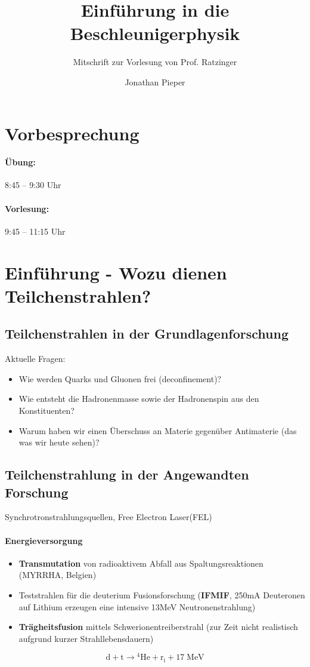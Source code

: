 \documentclass[12pt,DIV=15,a4paper,twoside,draft=false]{scrartcl}
\author{Jonathan Pieper}
\title{Einführung in die Beschleunigerphysik}
\subtitle{Mitschrift zur Vorlesung von Prof. Ratzinger}
\begin{document}
\begin{titlepage}
\maketitle
\tableofcontents
\end{titlepage}

\section{Vorbesprechung}
\paragraph{Übung:} 8:45 -- 9:30 Uhr
\paragraph{Vorlesung:} 9:45 -- 11:15 Uhr


\section[Einführung]{Einführung - Wozu dienen Teilchenstrahlen?}
\subsection{Teilchenstrahlen in der Grundlagenforschung}
Aktuelle Fragen:
\begin{itemize}
	\item Wie werden Quarks und Gluonen frei (deconfinement)?
	\item Wie entsteht die Hadronenmasse sowie der Hadronenspin aus den Konstituenten?
	\item Warum haben wir einen Überschuss an Materie gegenüber Antimaterie (das was wir heute sehen)?
\end{itemize}


\subsection{Teilchenstrahlung in der Angewandten Forschung}
Synchrotronstrahlungsquellen, 
Free Electron Laser(FEL)

\paragraph{Energieversorgung}
\begin{itemize}
\item  \textbf{Transmutation} von radioaktivem Abfall aus Spaltungsreaktionen (MYRRHA, Belgien)

\item Teststrahlen für die deuterium Fusionsforschung (\textbf{IFMIF}, 250\;{}mA Deuteronen auf Lithium erzeugen eine intensive 13\;{}MeV Neutronenstrahlung)

\item \textbf{Trägheitsfusion} mittels Schwerionentreiberstrahl (zur Zeit nicht realistisch aufgrund kurzer Strahllebensdauern)
\end{itemize}
$$ \mathrm{d + t \rightarrow {}^4 He + r_i + 17\;{}MeV} $$
\end{document}
